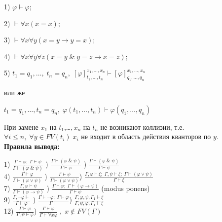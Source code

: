 \documentclass[18pt, a4paper]{extarticle}
\newcommand{\ampersand}{\;\&\;}
\newcommand{\Gm}{\Gamma}
\newcommand{\vp}{\varphi}
\begin{document}
1) $\varphi\vdash\varphi;$

2) $\vdash\forall x(x=x);$

3) $\vdash\forall x \forall y(x=y\to y=x);$

4) $\vdash\forall x\forall y\forall z(x=y\ampersand y=z\to x=z);$

5) $t_1=q_1,\dots,\;t_n=q_n,\;[\vp]^{x_1,\dots,x_n}_{t_1,\dots,t_n}\vdash[\vp]^{x_1,\dots,x_n}_{q_1,\dots,q_n}$

или же

$t_1=q_1,\dots,t_n=q_n,\;\varphi(t_1,\dots,t_n)\vdash\varphi(q_1,\dots,q_n)$

При замене $x_1$ на $t_1$,\dots$,x_n$ на $t_n$ не возникают коллизии, т.е.\\ $\forall i\leqslant n,\;\forall y\in FV(t_i)\;x_i$ не входит в область действия кванторов по $y$.\\

\textbf{Правила вывода:}

1) $\displaystyle \frac{\Gamma \vdash \varphi; \; \Gamma \vdash \psi}{\Gamma \vdash (\varphi \ampersand \psi)}$
) $\displaystyle \frac{\Gm \vdash (\varphi \ampersand \psi)}{\Gm \vdash \varphi}$
) $\displaystyle \frac{\Gm \vdash (\varphi \ampersand \psi)}{\Gm \vdash \psi}$\\

4) $\displaystyle \frac{\Gm \vdash \varphi}{\Gm \vdash (\varphi\vee\psi)}$
\qquad\;\;) $\displaystyle \frac{\Gm \vdash \psi}{\Gm \vdash (\varphi\vee\psi)}$\qquad\;) $\displaystyle \frac{\Gm,\varphi \vdash \xi; \; \Gm,\psi \vdash \xi; \; \Gm \vdash (\varphi \vee \psi)}{\Gm \vdash \xi}$\\

7) $\displaystyle \frac{\Gm,\varphi \vdash \psi}{\Gm\vdash (\varphi\to\psi)}$
\qquad{}) $\displaystyle \frac{\Gm\vdash\varphi;\;\Gm\vdash(\varphi\to\psi)} {\Gm\vdash\psi}$ (modus ponens)\\

9) $\displaystyle \frac{\Gm,\lnot \varphi \vdash}{\Gm\vdash\varphi}$
\qquad\qquad{}) $\displaystyle \frac{\Gm\vdash\lnot\varphi;\;\Gm\vdash\varphi}{\Gm\vdash}$\;\;) $\displaystyle \frac{\Gm,\varphi,\psi,\Gm_1 \vdash \xi}{\Gm,\psi,\varphi,\Gm_1 \vdash \xi}$
\qquad\\

12) $\displaystyle \frac{\Gm\vdash\varphi}{\Gm,\psi\vdash\varphi}$\qquad\;\;\;\;\;\;) $\displaystyle \frac{\Gm\vdash\varphi}{\Gm\vdash\forall x\varphi}\;,\;x\notin FV(\Gm)$\\
\end{document}

